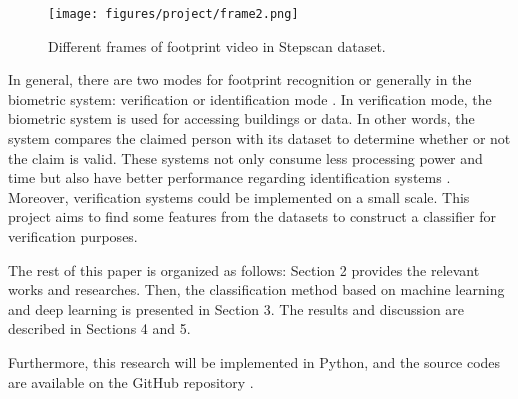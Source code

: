 \begin{figure}
    \centering
    \begin{minipage}[b]{.5\textwidth}
        \texttt{[image: figures/project/frame2.png]}
    \end{minipage}
    \caption{Different frames of footprint video in Stepscan dataset.}
    \label{fig:Stepscan_dataset}
\end{figure}

In general, there are two modes for footprint recognition or generally in the biometric system: verification or identification mode \cite{Jain2004AnRecognition}. In verification mode, the biometric system is used for accessing buildings or data. In other words, the system compares the claimed person with its dataset to determine whether or not the claim is valid. These systems not only consume less processing power and time but also have better performance regarding identification systems \cite{Jain2004AnRecognition}. Moreover, verification systems could be implemented on a small scale. This project aims to find some features from the datasets to construct a classifier for verification purposes. 



The rest of this paper is organized as follows: Section 2 provides the relevant works and researches. Then, the classification method based on machine learning and deep learning is presented in Section 3. The results and discussion are described in Sections 4 and 5.





Furthermore, this research will be implemented in Python, and the source codes are available on the GitHub repository \cite{SKazemii/EE6563}. 









